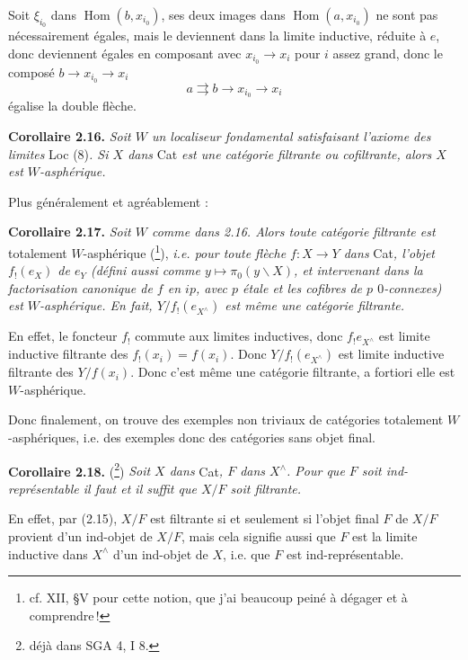 \documentclass[11pt]{article}
\newcommand{\printedpage}[1]{\marginpar{\footnotesize p.~#1}}
\newcommand{\msp}[1]{\marginpar{\footnotesize [#1]}}
\newcommand{\Hom}{\operatorname{Hom}}
\begin{document}
\printedpage{21}

\msp{page 34}
Soit $\xi_{i_0}$ dans $\Hom(b,x_{i_0})$, ses deux images dans $\Hom(a,x_{i_0})$ ne sont pas nécessairement égales, mais le deviennent dans la limite inductive, réduite à $e$, donc deviennent égales en composant avec $x_{i_0} \longrightarrow x_i$ pour $i$ assez grand, donc le composé $b \longrightarrow x_{i_0} \longrightarrow x_i$
\[
a \rightrightarrows b \longrightarrow x_{i_0} \longrightarrow x_i
\]
égalise la double flèche.

\noindent\textbf{Corollaire 2.16.} \textit{Soit $W$ un localiseur fondamental satisfaisant l'axiome des limites} Loc (8)\textit{. Si $X$ dans} Cat \textit{est une catégorie filtrante ou cofiltrante, alors $X$ est $W$-asphérique.}

Plus généralement et agréablement :

\noindent\textbf{Corollaire 2.17.} \textit{Soit $W$ comme dans 2.16. Alors toute catégorie filtrante est} totalement $W$-asphérique (\footnote[40]{cf. XII, §V pour cette notion, que j'ai beaucoup peiné à dégager et à comprendre\,!}), \textit{i.e. pour toute flèche $f : X \longrightarrow Y$ dans} Cat\textit{, l'objet $f_!(e_X)$ de $e_Y$ (défini aussi comme $y \longmapsto \pi_0(y\backslash X)$, et intervenant dans la factorisation canonique de $f$ en $ip$, avec $p$ étale et les cofibres} \textit{de $p$ $0$-connexes)} \msp{page 35} \textit{est $W$-asphérique. En fait, $Y/f_!(e_{X^\wedge})$ est même une catégorie filtrante.}

En effet, le foncteur $f_!$ commute aux limites inductives, donc $f_! e_{X^\wedge}$ est limite inductive filtrante des $f_!(x_i) = f(x_i)$. Donc $Y/f_!(e_{X^\wedge})$ est limite inductive filtrante des $Y/f(x_i)$. Donc c'est même une catégorie filtrante, a fortiori elle est $W$-asphérique.

Donc finalement, on trouve des exemples non triviaux de catégories totalement $W$-asphériques, i.e. des exemples donc des catégories sans objet final. %

\noindent\textbf{Corollaire 2.18.} (\footnote[41]{déjà dans SGA 4, I 8.}) \textit{Soit $X$ dans} Cat\textit{, $F$ dans $X^\wedge$. Pour que $F$ soit ind-représentable il faut et il suffit que $X/F$ soit filtrante.}

En effet, par (2.15), $X/F$ est filtrante si et seulement si l'objet final $F$ de $X/F$ provient d'un ind-objet de $X/F$, mais cela signifie aussi que $F$ est la limite inductive dans $X^\wedge$ d'un ind-objet de $X$, i.e. que $F$ est ind-représentable.
\end{document}
